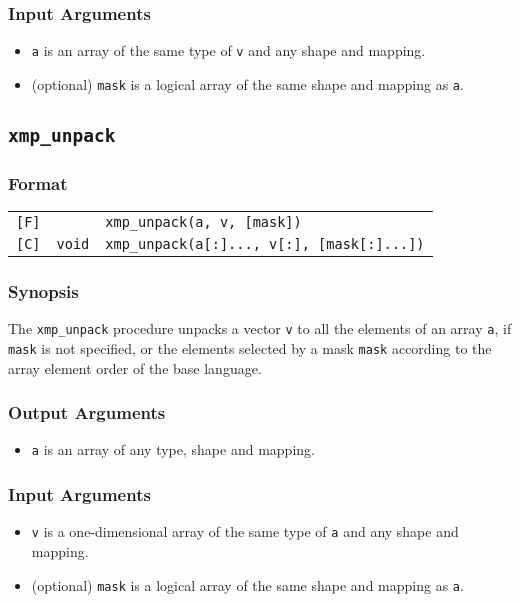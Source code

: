 \subsubsection*{Input Arguments}
\begin{itemize}
 \item {\tt a} is an array of the same type of {\tt v} and any shape
       and mapping.
 \item (optional) {\tt mask} is a logical array of the same shape and
       mapping as {\tt a}.
\end{itemize}


\subsection{\tt xmp\_unpack}

\subsubsection*{Format}

\begin{tabular}{lll}

\verb![F]!&            & {\tt xmp\_unpack(a, v, [mask])}\\

\verb![C]!& {\tt void} & {\tt xmp\_unpack(a[:]..., v[:], [mask[:]...])}\\

\end{tabular}

\subsubsection*{Synopsis}

The {\tt xmp\_unpack} procedure unpacks a vector {\tt v} to all the
elements of an array {\tt a}, if {\tt mask} is not specified, or the
elements selected by a mask {\tt mask} according
to the array element order of the base language.

\subsubsection*{Output Arguments}
\begin{itemize}
 \item {\tt a} is an array of any type, shape and mapping.
\end{itemize}

\subsubsection*{Input Arguments}
\begin{itemize}
 \item {\tt v} is a one-dimensional array of the same type of {\tt a}
       and any shape and mapping.
 \item (optional) {\tt mask} is a logical array of the same shape and
       mapping as {\tt a}.
\end{itemize}


